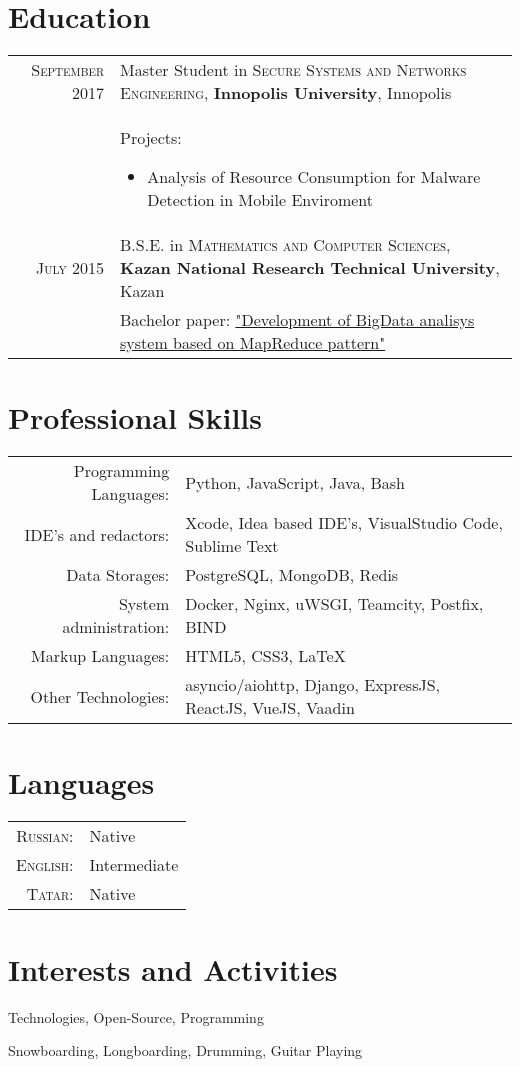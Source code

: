 \documentclass[a4paper,10pt]{article}
\begin{document}
\section{Education}
\begin{tabular}{r p{11cm}}	
 \textsc{September} 2017 & Master Student in \textsc{Secure Systems and Networks Engineering}, \textbf{Innopolis University}, Innopolis\\
 & Projects:
 \begin{itemize}
    \item Analysis of Resource Consumption for Malware Detection in Mobile Enviroment
 \end{itemize}\\
 \textsc{July} 2015 & B.S.E. in \textsc{Mathematics and Computer Sciences}, \textbf{Kazan National Research Technical University}, Kazan\\
 & Bachelor paper: \href{https://github.com/litleleprikon/bachelor\_paper}{"Development of BigData analisys system based on MapReduce pattern"}\\
\end{tabular}

\section{Professional Skills}
\begin{tabular}{r p{11cm}}

 Programming Languages:  &  Python, JavaScript, Java, Bash\\
 IDE's and redactors:    &  Xcode, Idea based IDE's, VisualStudio Code, Sublime Text\\
 Data Storages:          &  PostgreSQL, MongoDB, Redis \\
 System administration:  &  Docker, Nginx, uWSGI, Teamcity, Postfix, BIND\\
 Markup Languages:       &  HTML5, CSS3, \LaTeX \\
 Other Technologies:     &  asyncio/aiohttp, Django, ExpressJS, ReactJS, VueJS, Vaadin
 
\end{tabular}

\section{Languages}
\begin{tabular}{r p{11cm}}
 \textsc{Russian:}&Native\\
\textsc{English:}&Intermediate\\
\textsc{Tatar:}&Native\\
\end{tabular}

\section{Interests and Activities}
Technologies, Open-Source, Programming \par
Snowboarding, Longboarding, Drumming, Guitar Playing
\end{document}
